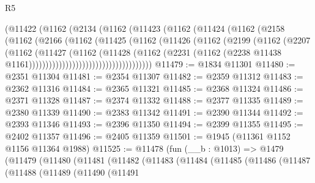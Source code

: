 \begin{lexlean}{R5}
\begin{coremodule}
                        (@11422
                          (@1162
                            (@2134
                              (@1162
                                (@11423
                                  (@1162
                                    (@11424
                                      (@1162
                                        (@2158
                                          (@1162
                                            (@2166
                                              (@1162
                                                (@11425
                                                  (@1162
                                                    (@11426
                                                      (@1162
                                                        (@2199
                                                          (@1162
                                                            (@2207
                                                              (@1162
                                                                (@11427
                                                                  (@1162
                                                                    (@11428
                                                                      (@1162
                                                                        (@2231
                                                                          (@1162
                                                                            (@2238
                                                                              @11438
                                                                              @1161)))))))))))))))))))))))))))))))))))))
@11479 := @1834 @11301
@11480 := @2351 @11304
@11481 := @2354 @11307
@11482 := @2359 @11312
@11483 := @2362 @11316
@11484 := @2365 @11321
@11485 := @2368 @11324
@11486 := @2371 @11328
@11487 := @2374 @11332
@11488 := @2377 @11335
@11489 := @2380 @11339
@11490 := @2383 @11342
@11491 := @2390 @11344
@11492 := @2393 @11346
@11493 := @2396 @11350
@11494 := @2399 @11355
@11495 := @2402 @11357
@11496 := @2405 @11359
@11501 := @1945 (@11361 @1152 @1156 @11364 @1988)
@11525 := @11478
    (fun (__b : @1013) =>
    @1479
      (@11479
        (@11480
          (@11481
            (@11482
              (@11483
                (@11484
                  (@11485
                    (@11486
                      (@11487
                        (@11488
                          (@11489
                            (@11490
                              (@11491

\end{coremodule}
\end{lexlean}
